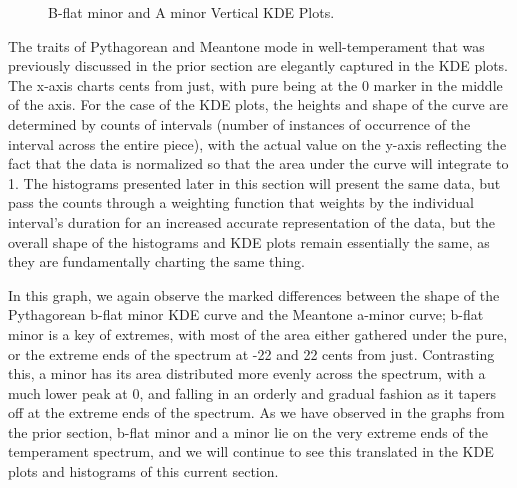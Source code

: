 \begin{figure}[H]
\vspace{1.5em}
    \centering
    \caption{B-flat minor and A minor Vertical KDE Plots.}
\end{figure}    The traits of Pythagorean and Meantone mode in well-temperament that was
previously discussed in the prior section are elegantly captured in the
KDE plots. The x-axis charts cents from just, with pure being at the 0
marker in the middle of the axis. For the case of the KDE plots, the
heights and shape of the curve are determined by counts of intervals
(number of instances of occurrence of the interval across the entire
piece), with the actual value on the y-axis reflecting the fact that the
data is normalized so that the area under the curve will integrate to 1.
The histograms presented later in this section will present the same
data, but pass the counts through a weighting function that weights by
the individual interval's duration for an increased accurate
representation of the data, but the overall shape of the histograms and
KDE plots remain essentially the same, as they are fundamentally
charting the same thing.

In this graph, we again observe the marked differences between the shape
of the Pythagorean b-flat minor KDE curve and the Meantone a-minor
curve; b-flat minor is a key of extremes, with most of the area either
gathered under the pure, or the extreme ends of the spectrum at -22 and
22 cents from just. Contrasting this, a minor has its area distributed
more evenly across the spectrum, with a much lower peak at 0, and
falling in an orderly and gradual fashion as it tapers off at the
extreme ends of the spectrum. As we have observed in the graphs from the
prior section, b-flat minor and a minor lie on the very extreme ends of
the temperament spectrum, and we will continue to see this translated in
the KDE plots and histograms of this current section.

